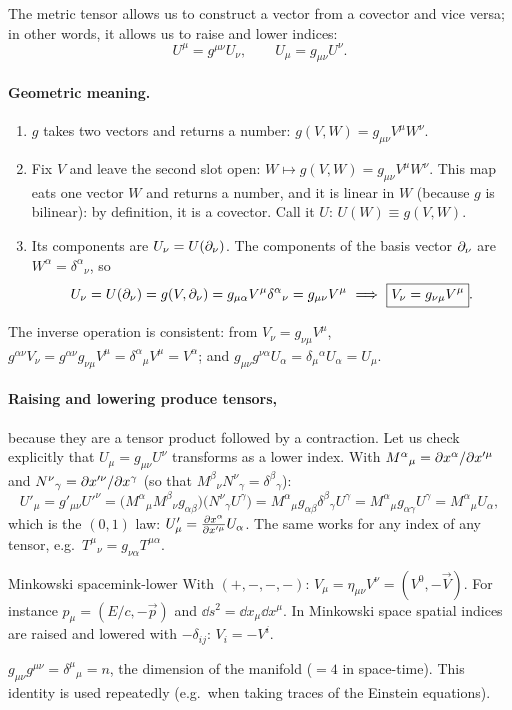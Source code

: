 The metric tensor allows us to construct a vector from a covector and vice versa; in other words, it allows us to raise and lower indices:
\begin{equation}
  \boxed{U^\mu=g^{\mu\nu}U_\nu,\qquad U_\mu=g_{\mu\nu}U^\nu .}
\end{equation}

\paragraph{Geometric meaning.}
\begin{enumerate}[label=(\roman*)]
\item $g$ takes two vectors and returns a number: $g(V,W)=g_{\mu\nu}V^\mu W^\nu$.
\item Fix $V$ and leave the second slot open: $W\mapsto g(V,W)=g_{\mu\nu}V^\mu W^\nu$. This map eats one vector $W$ and returns a number, and it is linear in $W$ (because $g$ is bilinear): by definition, it is a covector. Call it $U$: $U(W)\equiv g(V,W)$.
\item Its components are $U_\nu=U(\partial_\nu)$. The components of the basis vector $\partial_\nu$ are $W^\alpha=\delta^\alpha{}_\nu$, so
\[
  U_\nu=U(\pd_\nu)=g(V,\pd_\nu)=g_{\mu\alpha}V^\mu\delta^\alpha{}_\nu=g_{\mu\nu}V^\mu\ \Longrightarrow\ \boxed{V_\nu=g_{\nu\mu}V^\mu} .
\]
\end{enumerate}
The inverse operation is consistent: from $V_\nu=g_{\nu\mu}V^\mu$, $g^{\alpha\nu}V_\nu=g^{\alpha\nu}g_{\nu\mu}V^\mu=\delta^\alpha{}_\mu V^\mu=V^\alpha$; and $g_{\mu\nu}g^{\nu\alpha}U_\alpha=\delta_\mu{}^\alpha U_\alpha=U_\mu$.

\paragraph{Raising and lowering produce tensors,} because they are a tensor product followed by a contraction. Let us check explicitly that $U_\mu=g_{\mu\nu}U^\nu$ transforms as a lower index. With $M^\alpha{}_\mu=\partial x^\alpha/\partial x'^\mu$ and $N^\nu{}_\gamma=\partial x'^\nu/\partial x^\gamma$ (so that $M^\beta{}_\nu N^\nu{}_\gamma=\delta^\beta{}_\gamma$):
\[
  U'_\mu=g'_{\mu\nu}U'^\nu=\big(M^\alpha{}_\mu M^\beta{}_\nu g_{\alpha\beta}\big)\big(N^\nu{}_\gamma U^\gamma\big)
  =M^\alpha{}_\mu g_{\alpha\beta}\delta^\beta{}_\gamma U^\gamma=M^\alpha{}_\mu g_{\alpha\gamma}U^\gamma=M^\alpha{}_\mu U_\alpha ,
\]
which is the $(0,1)$ law: $U'_\mu=\frac{\partial x^\alpha}{\partial x'^\mu}U_\alpha$. The same works for any index of any tensor, e.g.\ $T^\mu{}_\nu=g_{\nu\alpha}T^{\mu\alpha}$.

\begin{example}{Minkowski space}{mink-lower}
With $(+,-,-,-)$: $V_\mu=\eta_{\mu\nu}V^\nu=(V^0,-\vec V)$. For instance $p_\mu=(E/c,-\vec p)$ and $\dd s^2=\dd x_\mu\dd x^\mu$. In Minkowski space spatial indices are raised and lowered with $-\delta_{ij}$: $V_i=-V^i$.
\end{example}

\begin{remarkbox}
$g_{\mu\nu}g^{\mu\nu}=\delta^\mu{}_\mu=n$, the dimension of the manifold ($=4$ in space-time). This identity is used repeatedly (e.g.\ when taking traces of the Einstein equations).
\end{remarkbox}
